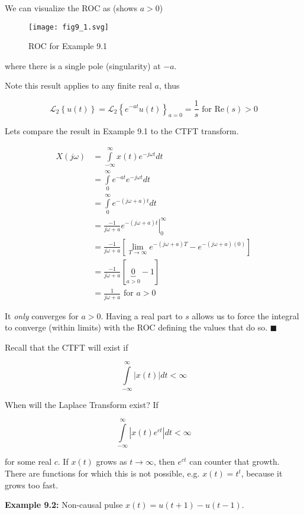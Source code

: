 \documentclass{article}
\begin{document}
We can visualize the ROC as (shows $a > 0$)

\begin{figure}
  \centering
  \texttt{[image: fig9\_1.svg]}
  \caption{ROC for Example 9.1}
\end{figure}

where there is a single pole (singularity) at $-a$.

Note this result applies to any finite real $a$, thus

\[
\mathcal{L}_2\left\{ u(t) \right\} = \mathcal{L}_2\left\{ e^{-at} u(t) \right\}_{a = 0} = \frac{1}{s} \text{ for Re}(s) > 0 
\]

Lets compare the result in Example 9.1 to the CTFT transform.

\begin{align}
  X(j\omega) &= \int\limits_{-\infty}^{\infty} x(t) e^{-j\omega t} dt\\
  &= \int\limits_{0}^{\infty} e^{-at} e^{-j\omega t} dt\\
  &= \int\limits_{0}^{\infty} e^{-(j\omega+a)t} dt\\
  &= \left. \frac{-1}{j\omega+a} e^{-(j\omega+a)t} \right|_{0}^{\infty}\\
  &= \frac{-1}{j\omega+a} \left[\lim_{T\rightarrow \infty} e^{-(j\omega+a)T} - e^{-(j\omega+a)(0)} \right]\\
  &= \frac{-1}{j\omega+a} \left[\underbrace{0}_{a > 0} - 1\right]\\
  &= \frac{1}{j\omega+a} \text{ for } a > 0
\end{align}

It \textit{only} converges for $a > 0$. Having a real part to $s$ allows us to force the integral to converge (within limits) with the ROC defining the values that do so. $\blacksquare$



Recall that the CTFT will exist if

\[
\int\limits_{-\infty}^{\infty}\left| x(t) \right| dt < \infty 
\]

When will the Laplace Transform exist? If

\[
\int\limits_{-\infty}^{\infty}\left| x(t)e^{ct} \right| dt < \infty 
\]

for some real $c$. If $x(t)$ grows as $t\rightarrow \infty$, then $e^{ct}$ can counter that growth. There are functions for which this is not possible, e.g. $x(t) = t^t$, because it grows too fast.

\textbf{Example 9.2:} Non-causal pulse $x(t) = u(t+1) - u(t-1)$.
\end{document}
